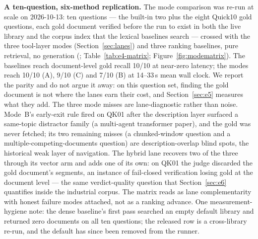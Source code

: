 \textbf{A ten-question, six-method replication.} The mode comparison was
re-run at scale on 2026-10-13: ten questions --- the built-in two plus the
eight Quick10 gold questions, each gold document verified before the run to
exist in both the live library and the corpus index that the lexical
baselines search --- crossed with the three tool-layer modes (Section~\ref{sec:lanes})
and three ranking baselines, pure retrieval, no generation
(;
Table~\ref{tab:e4-matrix}; Figure~\ref{fig:modematrix}). The baselines reach
document-level gold recall 10/10 at near-zero latency; the modes reach
10/10 (A), 9/10 (C) and 7/10 (B) at 14--33\,s mean wall clock. We report the
parity and do not argue it away: on this question set, finding the gold
document is not where the lanes earn their cost, and Section~\ref{sec:e5}
measures what they add. The three mode misses are lane-diagnostic rather
than noise. Mode~B's early-exit rule fired on QK01 after the description
layer surfaced a same-topic distractor family (a multi-agent transformer
paper), and the gold was never fetched; its two remaining misses (a
chunked-window question and a multiple-competing-documents question) are
description-overlap blind spots, the historical weak layer of navigation.
The hybrid lane recovers two of the three through its vector arm and adds
one of its own: on QK01 the judge discarded the gold document's segments, an
instance of fail-closed verification losing gold at the document level --- the
same verdict-quality question that Section~\ref{sec:e6} quantifies inside
the industrial corpus. The matrix reads as lane complementarity with honest
failure modes attached, not as a ranking advance. One measurement-hygiene
note: the dense baseline's first pass searched an empty default library and
returned zero documents on all ten questions; the released row is a
cross-library re-run, and the default has since been removed from the
runner.

